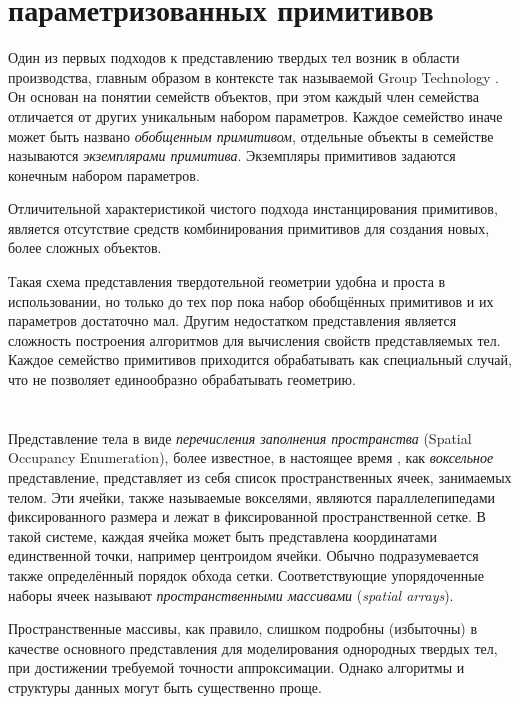 \section{ параметризованных примитивов} \label{sect_primitive_instatiation}

Один из первых подходов к представлению твердых тел возник в области производства, главным образом в контексте так называемой Group Technology \cite{Gall73}. Он основан на понятии семейств объектов, при этом каждый член семейства отличается от других уникальным набором параметров. Каждое семейство иначе может быть названо \textit{обобщенным примитивом}, отдельные объекты в семействе называются \textit{экземплярами примитива}. Экземпляры примитивов задаются конечным набором параметров.

Отличительной характеристикой чистого подхода инстанцирования примитивов, является отсутствие средств комбинирования примитивов для создания новых, более сложных объектов.

Такая схема представления твердотельной геометрии удобна и проста в использовании, но только до тех пор пока набор обобщённых примитивов и их параметров достаточно мал. Другим недостатком представления является сложность построения алгоритмов для вычисления свойств представляемых тел. Каждое семейство примитивов приходится обрабатывать как специальный случай, что не позволяет единообразно обрабатывать геометрию.

\section{} \label{sect_spatial_occupancy_enum}

Представление тела в виде \textit{перечисления заполнения пространства} (Spatial Occupancy Enumeration), более известное, в настоящее время , как \textit{воксельное} представление, представляет из себя список пространственных ячеек, занимаемых телом. Эти ячейки, также называемые вокселями, являются параллелепипедами фиксированного размера и лежат в фиксированной пространственной сетке. В такой системе, каждая ячейка может быть представлена координатами единственной точки, например центроидом ячейки. Обычно подразумевается также определённый порядок обхода сетки. Соответствующие упорядоченные наборы ячеек называют \textit{пространственными массивами} (\textit{spatial arrays}).

Пространственные массивы, как правило, слишком подробны (избыточны) в качестве основного представления для моделирования однородных твердых тел, при достижении требуемой точности аппроксимации. Однако алгоритмы и структуры данных могут быть существенно проще.

